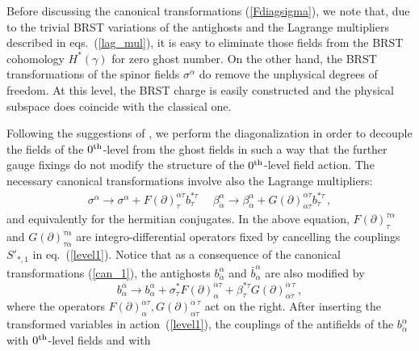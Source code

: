 \documentclass[a4paper,12pt]{article}
\begin{document}
Before discussing the canonical transformations (\ref{Fdiagsigma}), we
note that, due to the trivial BRST variations of the antighosts and
the Lagrange multipliers described in eqs.~(\ref{lag_mul}), it is easy
to eliminate those fields from the BRST cohomology $H^*(\gamma)$ for
zero ghost number. On the other hand, the BRST transformations of the
spinor fields $\sigma^\alpha$ do remove the unphysical degrees of
freedom. At this level, the BRST charge is easily constructed and the
physical subspace does coincide with the classical one.  

Following the suggestions of \cite{GPZ}, we perform the
diagonalization in order to decouple the fields of the $0^{\rm
  th}$-level from the ghost fields in such a way that the further
gauge fixings do not modify the structure of the $0^{\rm th}$-level
field action. The necessary canonical
transformations involve also the Lagrange multipliers:
\begin{eqnarray}
  \label{can_1}
  \sigma^\alpha \longrightarrow  \sigma^\alpha + 
  F(\partial)^{\alpha \dot \tau }_{\tau} b^{*\tau}_{\dot \tau}\, ~~~~~
  \beta^\alpha_{\dot \alpha} \longrightarrow   \beta^\alpha_{\dot \alpha} + 
  G(\partial)^{\alpha \dot \tau }_{\dot \alpha \tau} b^{*\tau}_{\dot
    \tau}\,,   
\end{eqnarray}
and equivalently for the hermitian conjugates. In the above equation,
$F(\partial)^{\dot \tau \alpha}_{\tau}$ and $G(\partial)^{\dot \tau
  \alpha}_{\tau \dot \alpha}$ are integro-differential operators fixed
by cancelling the couplings $S'_{*,1}$ in eq.~(\ref{level1}). Notice
that as a consequence of the canonical transformations (\ref{can_1}),
the antighosts $b^{\alpha}_{\dot\alpha}$ and $\bar b^{\dot
  \alpha}_{\alpha}$ are also modified by
\begin{equation}\label{can_2}
  b^{\dot \alpha}_{\alpha} \longrightarrow b^{\dot
    \alpha}_{\alpha} +  
  \sigma^*_\tau  F(\partial)^{\dot \alpha \tau}_{\alpha}
  + \beta^{*\dot \tau}_\tau  G(\partial)^{\dot  \alpha \,
    \tau}_{\alpha \dot  \tau}\,, 
\end{equation}
where the operators $F(\partial)^{\dot \alpha \tau}_{\alpha},
G(\partial)^{\dot \alpha \, \tau}_{\alpha \dot \tau}$ act on the
right. After inserting the transformed variables in action~(\ref{level1}),
the couplings of the antifields of the
$b^{\alpha}_{\dot \alpha}$ with $0^{\rm th}$-level fields and with
\end{document}
